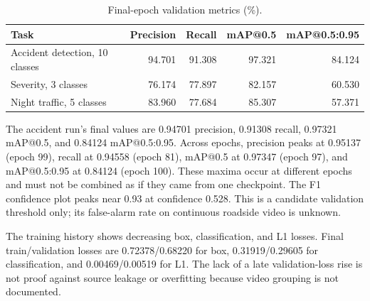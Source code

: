 \documentclass[12pt,a4paper]{article}
\begin{document}
\begin{table}[t]\centering\small
\caption{Final-epoch validation metrics (\%).}
\label{tab:metrics}
\begin{tabular}{lrrrr}\toprule
Task & Precision & Recall & mAP@0.5 & mAP@0.5:0.95\\\midrule
Accident detection, 10 classes & 94.701 & 91.308 & 97.321 & 84.124\\
Severity, 3 classes & 76.174 & 77.897 & 82.157 & 60.530\\
Night traffic, 5 classes & 83.960 & 77.684 & 85.307 & 57.371\\\bottomrule
\end{tabular}
\end{table}

The accident run's final values are 0.94701 precision, 0.91308 recall, 0.97321 mAP@0.5, and 0.84124 mAP@0.5:0.95. Across epochs, precision peaks at 0.95137 (epoch 99), recall at 0.94558 (epoch 81), mAP@0.5 at 0.97347 (epoch 97), and mAP@0.5:0.95 at 0.84124 (epoch 100). These maxima occur at different epochs and must not be combined as if they came from one checkpoint. The F1 confidence plot peaks near 0.93 at confidence 0.528. This is a candidate validation threshold only; its false-alarm rate on continuous roadside video is unknown.

The training history shows decreasing box, classification, and L1 losses. Final train/validation losses are 0.72378/0.68220 for box, 0.31919/0.29605 for classification, and 0.00469/0.00519 for L1. The lack of a late validation-loss rise is not proof against source leakage or overfitting because video grouping is not documented.
\end{document}

